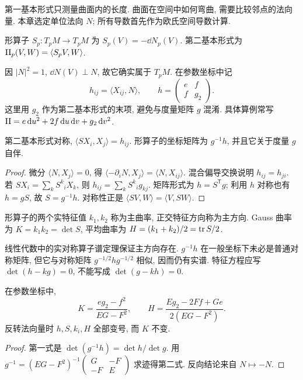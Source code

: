 第一基本形式只测量曲面内的长度. 曲面在空间中如何弯曲, 需要比较邻点的法向量. 本章选定单位法向 $N$; 所有导数首先作为欧氏空间导数计算.
\begin{definition}
形算子 $S_p:T_pM\to T_pM$ 为 $S_p(V)=-\dd N_p(V)$. 第二基本形式为 $\mathrm{II}_p(V,W)=\langle S_pV,W\rangle$.
\end{definition}
因 $|N|^2=1$, $\dd N(V)\perp N$, 故它确实属于 $T_pM$. 在参数坐标中记
\[
 h_{ij}=\langle X_{ij},N\rangle,\qquad
 h=\begin{pmatrix}e&f\\f&g_2\end{pmatrix}.
\]
这里用 $g_2$ 作为第二基本形式的末项, 避免与度量矩阵 $g$ 混淆. 具体算例常写 $\mathrm{II}=e\,\mathrm d u^2+2f\,\mathrm d u\,\mathrm d v+g_2\,\mathrm d v^2$.
\begin{proposition}\label{prop:shape}
第二基本形式对称, $\langle S X_i,X_j\rangle=h_{ij}$. 形算子的坐标矩阵为 $g^{-1}h$, 并且它关于度量 $g$ 自伴.
\end{proposition}
\begin{proof}
微分 $\langle N,X_j\rangle=0$, 得 $\langle-\partial_iN,X_j\rangle=\langle N,X_{ij}\rangle$. 混合偏导交换说明 $h_{ij}=h_{ji}$. 若 $SX_i=\sum_k S^k{}_iX_k$, 则 $h_{ij}=\sum_k S^k{}_i g_{kj}$. 矩阵形式为 $h=S^{\mathsf T}g$; 利用 $h$ 对称也有 $h=gS$, 故 $S=g^{-1}h$. 对称性正是 $\langle SV,W\rangle=\langle V,SW\rangle$.
\end{proof}
\begin{definition}
形算子的两个实特征值 $k_1,k_2$ 称为主曲率, 正交特征方向称为主方向. Gauss 曲率为 $K=k_1k_2=\det S$, 平均曲率为 $H=(k_1+k_2)/2=\operatorname{tr} S/2$.
\end{definition}
线性代数中的实对称算子谱定理保证主方向存在. $g^{-1}h$ 在一般坐标下未必是普通对称矩阵, 但它与对称矩阵 $g^{-1/2}hg^{-1/2}$ 相似, 因而仍有实谱. 特征方程应写 $\det(h-kg)=0$, 不能写成 $\det(g-kh)=0$.
\begin{proposition}\label{prop:KH}
在参数坐标中,
\[
 K=\frac{eg_2-f^2}{EG-F^2},\qquad
 H=\frac{Eg_2-2Ff+Ge}{2(EG-F^2)}.
\]
反转法向量时 $h,S,k_i,H$ 全部变号, 而 $K$ 不变.
\end{proposition}
\begin{proof}
第一式是 $\det(g^{-1}h)=\det h/\det g$. 用 $g^{-1}=(EG-F^2)^{-1}\left(\begin{smallmatrix}G&-F\\-F&E\end{smallmatrix}\right)$ 求迹得第二式. 反向结论来自 $N\mapsto-N$.
\end{proof}
